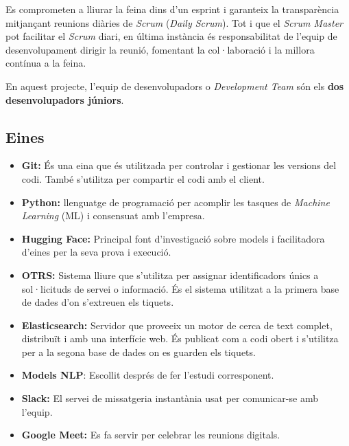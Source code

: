 Es comprometen a lliurar la feina dins d'un esprint i garanteix la transparència mitjançant reunions diàries de \textit{Scrum} (\textit{Daily Scrum}). Tot i que el \textit{Scrum Master} pot facilitar el \textit{Scrum} diari, en última instància és responsabilitat de l'equip de desenvolupament dirigir la reunió, fomentant la col·laboració i la millora contínua a la feina.

En aquest projecte, l'equip de desenvolupadors o \textit{Development Team} són els \textbf{dos desenvolupadors júniors}.






\subsection{Eines}

\begin{itemize}
    \item \textbf{Git:} És una eina que és utilitzada per controlar i gestionar les versions del codi. També s'utilitza per compartir el codi amb el client.
    \item \textbf{Python:} llenguatge de programació per acomplir les tasques de \textit{Machine Learning} (ML) i consensuat amb l'empresa.
    \item \textbf{Hugging Face:} Principal font d'investigació sobre models i facilitadora d'eines per la seva prova i execució.
    \item \textbf{OTRS:} Sistema lliure que s'utilitza per assignar identificadors únics a sol·licituds de servei o informació. És el sistema utilitzat a la primera base de dades d'on s'extreuen els tiquets.
    \item \textbf{Elasticsearch:} Servidor que proveeix un motor de cerca de text complet, distribuït i amb una interfície web. És publicat com a codi obert i s'utilitza per a la segona base de dades on es guarden els tiquets.
    \item \textbf{Models NLP\cite{Hugging-Face}}: Escollit després de fer l'estudi corresponent.
    \item \textbf{Slack:} El servei de missatgeria instantània usat per comunicar-se amb l'equip.
    \item \textbf{Google Meet:} Es fa servir per celebrar les reunions digitals.
\end{itemize}